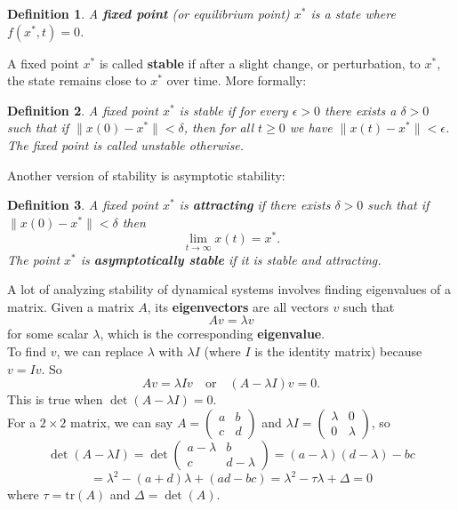 \documentclass[12pt]{article}
\newtheorem{definition}{Definition}[section]
\begin{document}
\begin{definition}
A \textbf{fixed point} (or equilibrium point) $x^*$ is a state where $f(x^*, t) = 0$.    
\end{definition}
A fixed point $x^*$ is called \textbf{stable} if after a slight change, or perturbation, to $x^*$, the state remains close to $x^*$ over time. More formally:

\begin{definition}
\label{def:stable}
A fixed point $x^*$ is stable if for every $\epsilon > 0$ there exists a $\delta > 0$ such that if $\|x(0) - x^*\| < \delta$, then for all $t \ge 0$ we have $\|x(t) - x^*\| < \epsilon$. The fixed point is called unstable otherwise.
\end{definition}

Another version of stability is asymptotic stability:

\begin{definition}
\label{def:asymptotic}
A fixed point $x^*$ is \textbf{attracting} if there exists $\delta > 0$ such that if $\|x(0) - x^*\| < \delta$ then $$\lim_{t \to \infty} x(t) = x^*.$$ The point $x^*$ is \textbf{asymptotically stable} if it is stable and attracting.
\end{definition}

A lot of analyzing stability of dynamical systems involves finding eigenvalues of a matrix. Given a matrix $A$, its \textbf{eigenvectors} are all vectors $v$ such that $$Av = \lambda v$$ for some scalar $\lambda$, which is the corresponding \textbf{eigenvalue}. \\

To find $v$, we can replace $\lambda$ with $\lambda I$ (where $I$ is the identity matrix) because $v = Iv$. So
$$Av = \lambda Iv \quad \text{or} \quad (A - \lambda I)v = 0.$$
This is true when $\det(A - \lambda I) = 0$. \\

For a $2\times 2$ matrix, we can say $A = \begin{pmatrix} a & b \\ c & d\end{pmatrix}$ and $\lambda I = \begin{pmatrix} \lambda & 0 \\ 0 & \lambda \end{pmatrix}$, so
$$\det(A - \lambda I) = \det\begin{pmatrix} a - \lambda & b \\ c & d - \lambda \end{pmatrix} = (a - \lambda)(d - \lambda) - bc$$
$$= \lambda^2 - (a + d)\lambda + (ad - bc) = \lambda^2 - \tau\lambda + \Delta = 0$$
where $\tau = \text{tr}(A)$ and $\Delta = \det(A)$. \\
\end{document}
